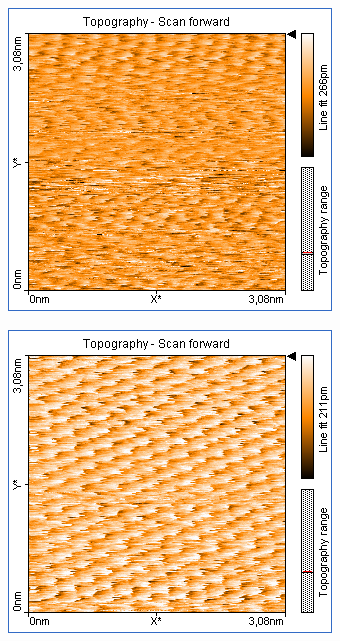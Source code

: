 \begin{figure}
    \begin{subfigure}[b]{\picwidth}
        \includegraphics[width=\textwidth]{data/Graphit/pic_06_13_3nm}
        \caption{}
        \label{fig:graphit_06_13}
    \end{subfigure}\qquad
    \begin{subfigure}[b]{\picwidth}
        \includegraphics[width=\textwidth]{data/Graphit/pic_06_14_3nm}

\end{subfigure}
\end{figure}
